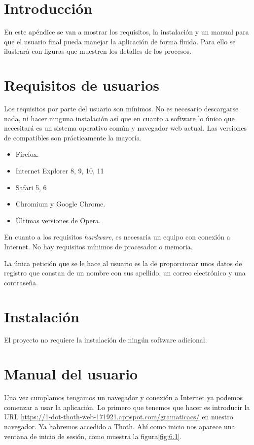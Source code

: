 
\section{Introducción}

En este apéndice se van a mostrar los requisitos, la instalación y un manual para que el usuario final pueda manejar la aplicación de forma fluida. Para ello se ilustrará con figuras que muestren los detalles de los procesos.

\section{Requisitos de usuarios}

Los requisitos por parte del usuario son mínimos. No es necesario descargarse nada, ni hacer ninguna instalación así que en cuanto a software lo único que necesitará es un sistema operativo común y navegador web actual. Las versiones de compatibles son prácticamente la mayoría.

\begin{itemize}
    \item Firefox.
    \item Internet Explorer 8, 9, 10, 11
    \item Safari 5, 6
    \item Chromium y Google Chrome.
    \item Últimas versiones de Opera.
\end{itemize}

En cuanto a los requisitos \emph{hardware}, es necesaria un equipo con conexión a Internet. No hay requisitos mínimos de procesador o memoria. 

La única petición que se le hace al usuario es la de proporcionar unos datos de registro que constan de un nombre con sus apellido, un correo electrónico y una contraseña.  

\section{Instalación}

El proyecto no requiere la instalación de ningún software adicional.

\section{Manual del usuario}

Una vez cumplamos tengamos un navegador y conexión a Internet ya podemos comenzar a usar la aplicación. Lo primero que tenemos que hacer es introducir la URL \url{https://1-dot-thoth-web-171921.appspot.com/gramaticacs/} en nuestro navegador. Ya habremos accedido a Thoth. Ahí como inicio nos aparece una ventana de inicio de sesión, como muestra la figura\ref{fig:6.1}.


